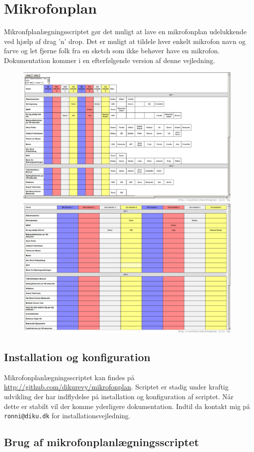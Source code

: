 \documentclass{article}
\begin{document}
\section{Mikrofonplan}
Mikronfplanlægningsscriptet gør det muligt at lave en mikrofonplan
udelukkende ved hjælp af drag 'n' drop. Det er muligt at tildele hver
enkelt mikrofon navn og farve og let fjerne folk fra en sketch som ikke
behøver have en mikrofon.  Dokumentation kommer i en
efterfølgende version af denne vejledning.
\begin{figure}[H]
\begin{center}
\includegraphics[width=\textwidth]{mikrofonplan-example}
\includegraphics[width=\textwidth]{mikrofonplan-example2}
\end{center}
\end{figure}
\subsection{Installation og konfiguration}
Mikrofonplanlægningsscriptet kan findes på
\url{http://github.com/dikurevy/mikrofonplan}. Scriptet er stadig under
kraftig udvikling der har indflydelse på installation og konfiguration
af scriptet. Når dette er stabilt vil der komme yderligere dokumentation. Indtil da
kontakt mig på \texttt{ronni@diku.dk} for installationsvejledning.
\subsection{Brug af mikrofonplanlægningsscriptet}
\end{document}
